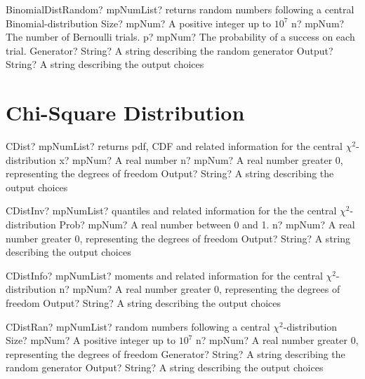 \documentclass[12pt,a4paper,openany]{book}
\begin{document}
\begin{mpFunctionsExtract}
\mpFunctionFive
{BinomialDistRandom? mpNumList? returns random numbers following a central Binomial-distribution}
{Size? mpNum? A positive integer up to $10^7$}
{n? mpNum? The number of Bernoulli trials.}
{p? mpNum? The probability of a success on each trial.}
{Generator? String? A string describing the random generator}
{Output? String? A string describing the output choices}
\end{mpFunctionsExtract}

\section{Chi-Square Distribution}

\begin{mpFunctionsExtract}
\mpFunctionThree
{CDist? mpNumList? returns pdf, CDF and related information for the central $\chi^2$-distribution}
{x? mpNum? A real number}
{n? mpNum? A real number greater 0, representing the degrees of freedom}
{Output? String? A string describing the output choices}
\end{mpFunctionsExtract}

\begin{mpFunctionsExtract}
\mpFunctionThree
{CDistInv? mpNumList? quantiles and related information for the the central $\chi^2$-distribution}
{Prob? mpNum? A real number between 0 and 1.}
{n? mpNum? A real number greater 0, representing the degrees of freedom}
{Output? String? A string describing the output choices}
\end{mpFunctionsExtract}

\begin{mpFunctionsExtract}
\mpFunctionTwo
{CDistInfo? mpNumList? moments and related information for the central $\chi^2$-distribution}
{n? mpNum? A real number greater 0, representing the degrees of freedom}
{Output? String? A string describing the output choices}
\end{mpFunctionsExtract}

\begin{mpFunctionsExtract}
\mpFunctionFour
{CDistRan? mpNumList? random numbers following a central $\chi^2$-distribution}
{Size? mpNum? A positive integer up to $10^7$}
{n? mpNum? A real number greater 0, representing the degrees of freedom}
{Generator? String? A string describing the random generator}
{Output? String? A string describing the output choices}
\end{mpFunctionsExtract}
\end{document}
